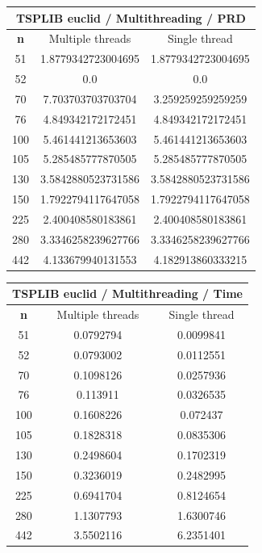 \documentclass{article}
\begin{document}
\begin{center}
\begin{tabular}{|c|c|c|}
\hline
\multicolumn{3}{|c|}{\textbf{TSPLIB euclid / Multithreading / PRD}}\\
\hline
\textbf{n} & Multiple threads & Single thread\\
\hline
51 & 1.8779342723004695 & 1.8779342723004695\\
\hline
52 & 0.0 & 0.0\\
\hline
70 & 7.703703703703704 & 3.259259259259259\\
\hline
76 & 4.849342172172451 & 4.849342172172451\\
\hline
100 & 5.461441213653603 & 5.461441213653603\\
\hline
105 & 5.285485777870505 & 5.285485777870505\\
\hline
130 & 3.5842880523731586 & 3.5842880523731586\\
\hline
150 & 1.7922794117647058 & 1.7922794117647058\\
\hline
225 & 2.400408580183861 & 2.400408580183861\\
\hline
280 & 3.3346258239627766 & 3.3346258239627766\\
\hline
442 & 4.133679940131553 & 4.182913860333215\\
\hline
\end{tabular}
\end{center}


\begin{center}
\begin{tabular}{|c|c|c|}
\hline
\multicolumn{3}{|c|}{\textbf{TSPLIB euclid / Multithreading / Time}}\\
\hline
\textbf{n} & Multiple threads & Single thread\\
\hline
51 & 0.0792794 & 0.0099841\\
\hline
52 & 0.0793002 & 0.0112551\\
\hline
70 & 0.1098126 & 0.0257936\\
\hline
76 & 0.113911 & 0.0326535\\
\hline
100 & 0.1608226 & 0.072437\\
\hline
105 & 0.1828318 & 0.0835306\\
\hline
130 & 0.2498604 & 0.1702319\\
\hline
150 & 0.3236019 & 0.2482995\\
\hline
225 & 0.6941704 & 0.8124654\\
\hline
280 & 1.1307793 & 1.6300746\\
\hline
442 & 3.5502116 & 6.2351401\\
\hline
\end{tabular}
\end{center}
\end{document}
